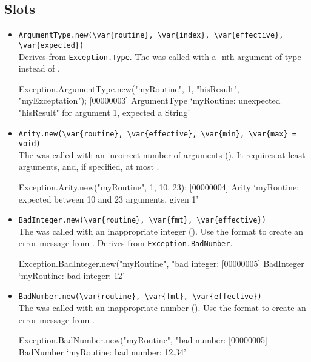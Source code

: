 \subsection{Slots}
\begin{itemize}
\item \lstinline|ArgumentType.new(\var{routine}, \var{index}, \var{effective}, \var{expected})|\\
  Derives from \lstinline|Exception.Type|.  The  was
  called with a -nth argument of type 
  instead of .
\begin{urbiscript}[firstnumber=last]
Exception.ArgumentType.new("myRoutine", 1, "hisResult", "myExceptation");
[00000003] ArgumentType `myRoutine: unexpected "hisResult" for argument 1, expected a String'
\end{urbiscript}

\item \lstinline|Arity.new(\var{routine}, \var{effective}, \var{min}, \var{max} = void)|\\
  The  was called with an incorrect number of arguments
  ().  It requires at least  arguments, and,
  if specified, at most .
\begin{urbiscript}[firstnumber=last]
Exception.Arity.new("myRoutine", 1, 10, 23);
[00000004] Arity `myRoutine: expected between 10 and 23 arguments, given 1'
\end{urbiscript}

\item \lstinline|BadInteger.new(\var{routine}, \var{fmt}, \var{effective})|\\
  The  was called with an inappropriate integer
  ().  Use the format  to create an error
  message from .  Derives from
  \lstinline|Exception.BadNumber|.
\begin{urbiscript}[firstnumber=last]
Exception.BadInteger.new("myRoutine", "bad integer: %
[00000005] BadInteger `myRoutine: bad integer: 12'
\end{urbiscript}

\item \lstinline|BadNumber.new(\var{routine}, \var{fmt}, \var{effective})|\\
  The  was called with an inappropriate number
  ().  Use the format  to create an error
  message from .
\begin{urbiscript}[firstnumber=last]
Exception.BadNumber.new("myRoutine", "bad number: %
[00000005] BadNumber `myRoutine: bad number: 12.34'
\end{urbiscript}


\end{itemize}
